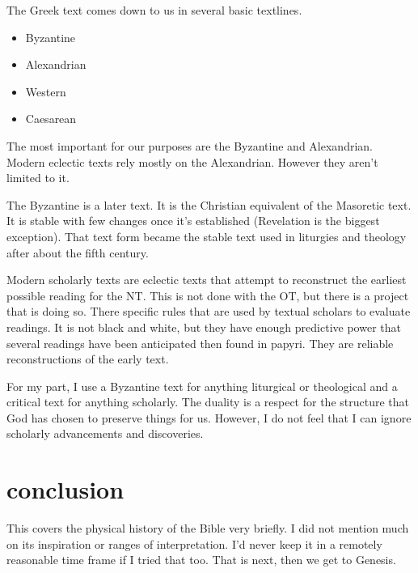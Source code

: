 \documentclass{beamer}
\begin{document}
\begin{frame}
  The Greek text comes down to us in several basic textlines.\pause
  \begin{itemize}
	\item Byzantine\pause
	\item Alexandrian\pause
	\item Western\pause
	\item Caesarean
  \end{itemize}
\end{frame}

\begin{frame}
  The most important for our purposes are the Byzantine and Alexandrian.
  Modern eclectic texts rely mostly on the Alexandrian.
  However they aren't limited to it.
\end{frame}

\begin{frame}
  The Byzantine is a later text.
  It is the Christian equivalent of the Masoretic text.
  It is stable with few changes once it's established (Revelation is the biggest exception).
  That text form became the stable text used in liturgies and theology after about the fifth century.
\end{frame}

\begin{frame}
  Modern scholarly texts are eclectic texts that attempt to reconstruct the earliest possible reading for the NT.
  This is not done with the OT, but there is a project that is doing so.
  There specific rules that are used by textual scholars to evaluate readings.
  It is not black and white, but they have enough predictive power that several readings have been anticipated then found in papyri.
  They are reliable reconstructions of the early text.
\end{frame}

\begin{frame}
  For my part, I use a Byzantine text for anything liturgical or theological and a critical text for anything scholarly.
  The duality is a respect for the structure that God has chosen to preserve things for us.
  However, I do not feel that I can ignore scholarly advancements and discoveries.
\end{frame}

\section{conclusion}

\begin{frame}
  This covers the physical history of the Bible very briefly.
  I did not mention much on its inspiration or ranges of interpretation.
  I'd never keep it in a remotely reasonable time frame if I tried that too.
  That is next, then we get to Genesis.
\end{frame}
\end{document}
